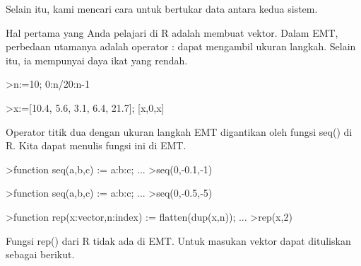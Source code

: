 \documentclass[a4paper,10pt]{article}
\begin{document}
\begin{eulernotebook}
\begin{eulercomment}
\begin{eulercomment}
\begin{eulercomment}
\begin{eulercomment}
\begin{eulercomment}
\begin{eulercomment}
\begin{eulercomment}
\begin{eulercomment}
\begin{eulercomment}
Selain itu, kami mencari cara untuk bertukar data antara kedua sistem.
\end{eulercomment}
\begin{eulercomment}
Hal pertama yang Anda pelajari di R adalah membuat vektor. Dalam EMT,
perbedaan utamanya adalah operator : dapat mengambil ukuran langkah.
Selain itu, ia mempunyai daya ikat yang rendah.
\end{eulercomment}
\begin{eulerprompt}
>n:=10; 0:n/20:n-1
\end{eulerprompt}
\begin{euleroutput}
  [0,  0.5,  1,  1.5,  2,  2.5,  3,  3.5,  4,  4.5,  5,  5.5,  6,  6.5,
  7,  7.5,  8,  8.5,  9]
\end{euleroutput}
\begin{eulerprompt}
>x:=[10.4, 5.6, 3.1, 6.4, 21.7]; [x,0,x]
\end{eulerprompt}
\begin{euleroutput}
  [10.4,  5.6,  3.1,  6.4,  21.7,  0,  10.4,  5.6,  3.1,  6.4,  21.7]
\end{euleroutput}
\begin{eulercomment}
Operator titik dua dengan ukuran langkah EMT digantikan oleh fungsi
seq() di R. Kita dapat menulis fungsi ini di EMT.
\end{eulercomment}
\begin{eulerprompt}
>function seq(a,b,c) := a:b:c; ...
>seq(0,-0.1,-1)
\end{eulerprompt}
\begin{euleroutput}
  [0,  -0.1,  -0.2,  -0.3,  -0.4,  -0.5,  -0.6,  -0.7,  -0.8,  -0.9,  -1]
\end{euleroutput}
\begin{eulerprompt}
>function seq(a,b,c) := a:b:c; ...
>seq(0,-0.5,-5)
\end{eulerprompt}
\begin{euleroutput}
  [0,  -0.5,  -1,  -1.5,  -2,  -2.5,  -3,  -3.5,  -4,  -4.5,  -5]
\end{euleroutput}
\begin{eulerprompt}
>function rep(x:vector,n:index) := flatten(dup(x,n)); ...
>rep(x,2)
\end{eulerprompt}
\begin{euleroutput}
  [10.4,  5.6,  3.1,  6.4,  21.7,  10.4,  5.6,  3.1,  6.4,  21.7]
\end{euleroutput}
\begin{eulercomment}
Fungsi rep() dari R tidak ada di EMT. Untuk masukan vektor dapat
dituliskan sebagai berikut.


\end{eulercomment}
\end{eulercomment}
\end{eulercomment}
\end{eulercomment}
\end{eulercomment}
\end{eulercomment}
\end{eulercomment}
\end{eulercomment}
\end{eulercomment}
\end{eulernotebook}
\end{document}
